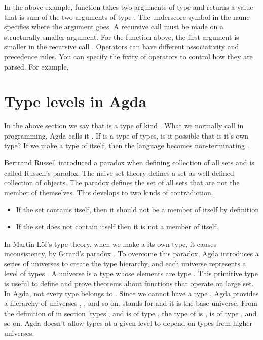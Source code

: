 In the above example, function \inline{_+_} takes two arguments of type
 and returns a value that is sum of the two arguments of type
. The underscore symbol in the name specifies where the argument
goes. A recursive call must be made on a structurally smaller argument. For the
function \inline{_+_} above, the first argument  is smaller in the
recursive call . Operators can have different associativity and
precedence rules. You can specify the fixity of operators to control how they
are parsed. For example,

\section{Type levels in Agda}
In the above section we say that  is a type of kind .
What we normally call  in programming, Agda calls it .
If  is a type of types, is it possible that  is it's own
type? If we make  a type of itself, then the language becomes
non-terminating \cite{AgdaTB}. 

Bertrand Russell introduced a paradox when defining collection of all sets and
is called Russell's paradox. The naive set theory defines a set as well-defined
collection of objects. The paradox \cite{russell2020principles} defines the set
of all sets that are not the member of themselves. This develops to two kinds of
contradiction.
\begin{itemize}
  \item If the set contains itself, then it should not be a member of itself by
  definition
  \item If the set does not contain itself then it is not a member of itself.
\end{itemize}

In Martin-Löf's type theory, when we make a  its own type, it causes
inconsistency, by Girard's paradox \cite{coquand1986analysis}. To overcome this
paradox, Agda introduces a series of universes to create the type hierarchy, and
each universe represents a level of types \cite{sortSystem}. A universe is a
type whose elements are type \cite{universeagda}. This primitive type is useful
to define and prove theorems about functions that operate on large set. In Agda,
not every type belongs to . Since we cannot have a type , Agda provides a hierarchy of universes , ,
 and so on.  stands for  and it is the
base universe. From the definition of  in section \ref{types},
 and  is of type , the type of
 is ,  is of type , and so on.
Agda doesn't allow types at a given level to depend on types from higher
universes.  

